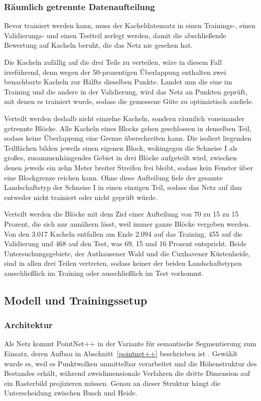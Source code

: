 \subsubsection{Räumlich getrennte Datenaufteilung}\label{split}

Bevor trainiert werden kann, muss der Kacheldatensatz in einen Trainings-, einen Validierungs- und einen Testteil zerlegt werden, damit die abschließende Bewertung auf Kacheln beruht, die das Netz nie gesehen hat.

Die Kacheln zufällig auf die drei Teile zu verteilen, wäre in diesem Fall irreführend, denn wegen der 50-prozentigen Überlappung enthalten zwei benachbarte Kacheln zur Hälfte dieselben Punkte. Landet nun die eine im Training und die andere in der Validierung, wird das Netz an Punkten geprüft, mit denen es trainiert wurde, sodass die gemessene Güte zu optimistisch ausfiele.

Verteilt werden deshalb nicht einzelne Kacheln, sondern räumlich voneinander getrennte Blöcke. Alle Kacheln eines Blocks gehen geschlossen in denselben Teil, sodass keine Überlappung eine Grenze überschreiten kann. Die isoliert liegenden Teilflächen bilden jeweils einen eigenen Block, wohingegen die Schneise I als großes, zusammenhängendes Gebiet in drei Blöcke aufgeteilt wird, zwischen denen jeweils ein zehn Meter breiter Streifen frei bleibt, sodass kein Fenster über eine Blockgrenze reichen kann. Ohne diese Aufteilung fiele der gesamte Landschaftstyp der Schneise I in einen einzigen Teil, sodass das Netz auf ihm entweder nicht trainiert oder nicht geprüft würde.

Verteilt werden die Blöcke mit dem Ziel einer Aufteilung von 70 zu 15 zu 15 Prozent, die sich nur annähern lässt, weil immer ganze Blöcke vergeben werden. Von den 3.017 Kacheln entfallen am Ende 2.094 auf das Training, 455 auf die Validierung und 468 auf den Test, was 69, 15 und 16 Prozent entspricht. Beide Untersuchungsgebiete, der Authausener Wald und die Cuxhavener Küstenheide, sind in allen drei Teilen vertreten, sodass keiner der beiden Landschaftstypen ausschließlich im Training oder ausschließlich im Test vorkommt.

\subsection{Modell und Trainingssetup}\label{modell_training}

\subsubsection{Architektur}\label{modell_pointnetpp}
Als Netz kommt PointNet++ in der Variante für semantische Segmentierung zum Einsatz, deren Aufbau in Abschnitt~\ref{pointnet++} beschrieben ist \cite{Qi.2017b}. Gewählt wurde es, weil es Punktwolken unmittelbar verarbeitet und die Höhenstruktur des Bestandes erhält, während zweidimensionale Verfahren die dritte Dimension auf ein Rasterbild projizieren müssen. Genau an dieser Struktur hängt die Unterscheidung zwischen Busch und Heide.

